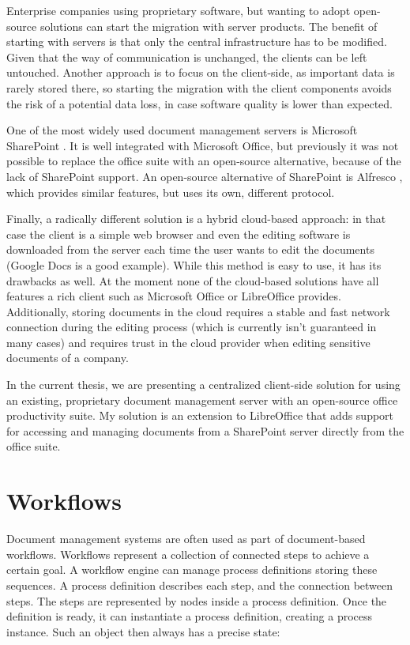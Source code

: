 Enterprise companies using proprietary software, but wanting to adopt
open-source solutions can start the migration with server products. The benefit
of starting with servers is that only the central infrastructure has to be
modified. Given that the way of communication is unchanged, the clients can be left
untouched. Another approach is to focus on the client-side, as important data
is rarely stored there, so starting the migration with the client components
avoids the risk of a potential data loss, in case software quality is lower
than expected.

One of the most widely used document management servers is Microsoft
SharePoint \cite{sharepoint}. It is well integrated with Microsoft Office, but
previously it was not possible to replace the office suite with an open-source
alternative, because of the lack of SharePoint support. An open-source
alternative of SharePoint is Alfresco \cite{alfresco}, which provides similar
features, but uses its own, different protocol.

Finally, a radically different solution is a hybrid cloud-based approach: in that case
the client is a simple web browser and even the editing software is downloaded from
the server each time the user wants to edit the documents (Google
Docs \cite{google-docs} is a good example). While this method is easy to use, it
has its drawbacks as well. At the moment none of the cloud-based solutions have
all features a rich client such as Microsoft Office or LibreOffice provides.
Additionally, storing documents in the cloud requires a stable and fast network
connection during the editing process (which is currently isn't guaranteed in many
cases) and requires trust in the cloud provider when editing sensitive
documents of a company.

In the current thesis, we are presenting a centralized client-side solution for
using an existing, proprietary document management server with an open-source
office productivity suite. My solution is an extension to LibreOffice that adds
support for accessing and managing documents from a SharePoint server directly
from the office suite.

\section{Workflows}

Document management systems are often used as part of document-based workflows.
Workflows represent a collection of connected steps to achieve a certain goal.
A workflow engine can manage process definitions storing these sequences. A
process definition describes each step, and the connection between steps. The
steps are represented by nodes inside a process definition. Once the definition
is ready, it can instantiate a process definition, creating a process instance.
Such an object then always has a precise state:

